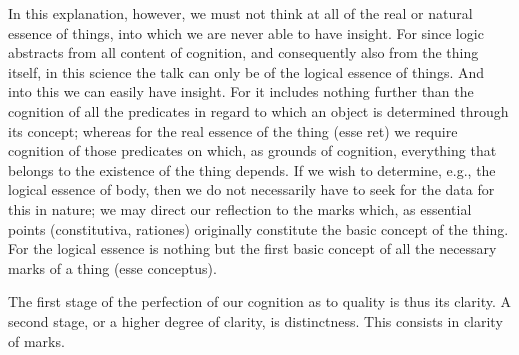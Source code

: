 In this explanation, however, we must not think at all of
the real or natural essence of things,
into which we are never able to have insight.
For since logic abstracts from all content of cognition, and
consequently also from the thing itself, in this science
the talk can only be of the logical essence of things.
And into this we can easily have insight.
For it includes nothing further than the cognition of
all the predicates in regard to which
an object is determined through its concept;
whereas for the real essence of the thing (esse ret)
we require cognition of those predicates on which,
as grounds of cognition, everything that belongs
to the existence of the thing depends.
If we wish to determine, e.g., the logical essence of body, then
we do not necessarily have to seek for the data for this in nature;
we may direct our reflection to the marks which, as essential points
(constitutiva, rationes) originally constitute the basic concept of the thing.
For the logical essence is nothing but the first basic concept of
all the necessary marks of a thing (esse conceptus).

The first stage of the perfection of our cognition
as to quality is thus its clarity.
A second stage, or a higher degree of clarity, is distinctness.
This consists in clarity of marks.

